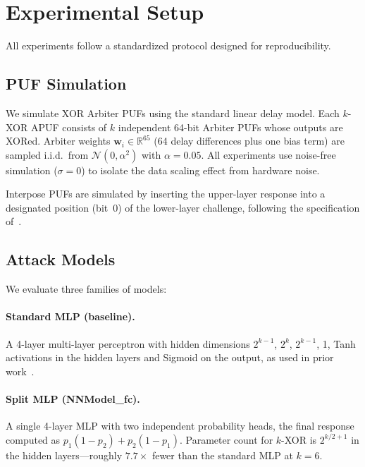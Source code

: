 \section{Experimental Setup}
\label{sec:setup}

All experiments follow a standardized protocol designed for reproducibility.

\subsection{PUF Simulation}

We simulate XOR Arbiter PUFs using the standard linear delay model.
Each $k$-XOR APUF consists of $k$ independent 64-bit Arbiter PUFs whose
outputs are XORed.  Arbiter weights
$\mathbf{w}_i \in \mathbb{R}^{65}$ (64 delay differences plus one bias term)
are sampled i.i.d.\ from $\mathcal{N}(0, \alpha^2)$ with $\alpha = 0.05$.
All experiments use noise-free simulation ($\sigma = 0$) to isolate the
data scaling effect from hardware noise.

Interpose PUFs are simulated by inserting the upper-layer response into
a designated position (bit~0) of the lower-layer challenge, following the
specification of~\cite{wisiol2020splitting}.

\subsection{Attack Models}

We evaluate three families of models:

\paragraph{Standard MLP (baseline).} A 4-layer multi-layer perceptron with
hidden dimensions $2^{k-1}$, $2^{k}$, $2^{k-1}$, 1, Tanh activations in the
hidden layers and Sigmoid on the output, as used in prior
work~\cite{ruhrmair2010modeling,santikellur2023}.

\paragraph{Split MLP (NNModel\_fc).} A single 4-layer MLP with two independent
probability heads, the final response computed as $p_1(1-p_2) + p_2(1-p_1)$.
Parameter count for $k$-XOR is
$2^{k/2+1}$ in the hidden layers---roughly $7.7\times$ fewer than the
standard MLP at $k=6$.

